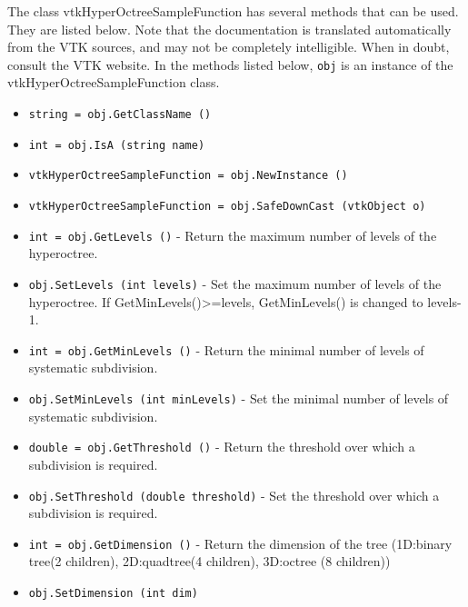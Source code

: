 The class vtkHyperOctreeSampleFunction has several methods that can be used.
  They are listed below.
Note that the documentation is translated automatically from the VTK sources,
and may not be completely intelligible.  When in doubt, consult the VTK website.
In the methods listed below, \verb|obj| is an instance of the vtkHyperOctreeSampleFunction class.
\begin{itemize}
\item  \verb|string = obj.GetClassName ()|

\item  \verb|int = obj.IsA (string name)|

\item  \verb|vtkHyperOctreeSampleFunction = obj.NewInstance ()|

\item  \verb|vtkHyperOctreeSampleFunction = obj.SafeDownCast (vtkObject o)|

\item  \verb|int = obj.GetLevels ()| -  Return the maximum number of levels of the hyperoctree.
 

\item  \verb|obj.SetLevels (int levels)| -  Set the maximum number of levels of the hyperoctree. If
 GetMinLevels()>=levels, GetMinLevels() is changed to levels-1.
 
 
 

\item  \verb|int = obj.GetMinLevels ()| -  Return the minimal number of levels of systematic subdivision.
 

\item  \verb|obj.SetMinLevels (int minLevels)| -  Set the minimal number of levels of systematic subdivision.
 
 

\item  \verb|double = obj.GetThreshold ()| -  Return the threshold over which a subdivision is required.
 

\item  \verb|obj.SetThreshold (double threshold)| -  Set the threshold over which a subdivision is required.
 
 

\item  \verb|int = obj.GetDimension ()| -  Return the dimension of the tree (1D:binary tree(2 children), 2D:quadtree(4 children),
 3D:octree (8 children))
 

\item  \verb|obj.SetDimension (int dim)|


\end{itemize}
